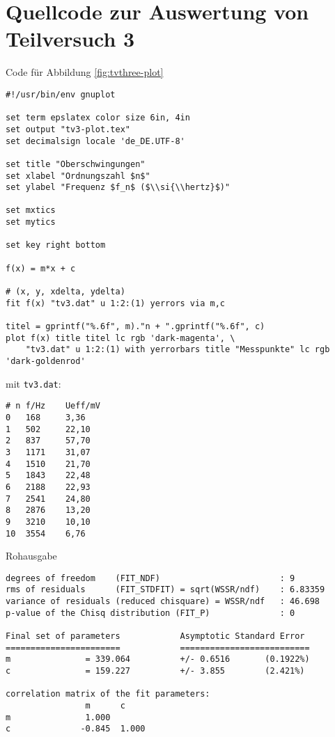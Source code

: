 \section{\gnuplot{} Quellcode zur Auswertung von Teilversuch 3}
    \label{appdx:gnuplotTV3}
    \gnuplot{} Code für Abbildung \ref{fig:tvthree-plot}
    {  
        \renewcommand{\fcolorbox}[4][]{#4}
        \begin{verbatim}
#!/usr/bin/env gnuplot

set term epslatex color size 6in, 4in
set output "tv3-plot.tex"
set decimalsign locale 'de_DE.UTF-8'

set title "Oberschwingungen"
set xlabel "Ordnungszahl $n$"
set ylabel "Frequenz $f_n$ ($\\si{\\hertz}$)"

set mxtics
set mytics

set key right bottom

f(x) = m*x + c

# (x, y, xdelta, ydelta)
fit f(x) "tv3.dat" u 1:2:(1) yerrors via m,c

titel = gprintf("%.6f", m)."n + ".gprintf("%.6f", c)
plot f(x) title titel lc rgb 'dark-magenta', \
    "tv3.dat" u 1:2:(1) with yerrorbars title "Messpunkte" lc rgb 'dark-goldenrod'
        \end{verbatim}
    }
    mit \texttt{tv3.dat}:
    \begin{verbatim}
# n f/Hz    Ueff/mV
0   168     3,36
1   502     22,10
2   837     57,70
3   1171    31,07
4   1510    21,70
5   1843    22,48
6   2188    22,93
7   2541    24,80
8   2876    13,20
9   3210    10,10
10  3554    6,76
    \end{verbatim}
    Rohausgabe
    \begin{verbatim}
degrees of freedom    (FIT_NDF)                        : 9
rms of residuals      (FIT_STDFIT) = sqrt(WSSR/ndf)    : 6.83359
variance of residuals (reduced chisquare) = WSSR/ndf   : 46.698
p-value of the Chisq distribution (FIT_P)              : 0

Final set of parameters            Asymptotic Standard Error
=======================            ==========================
m               = 339.064          +/- 0.6516       (0.1922%)
c               = 159.227          +/- 3.855        (2.421%)

correlation matrix of the fit parameters:
                m      c      
m               1.000 
c              -0.845  1.000
    \end{verbatim}

